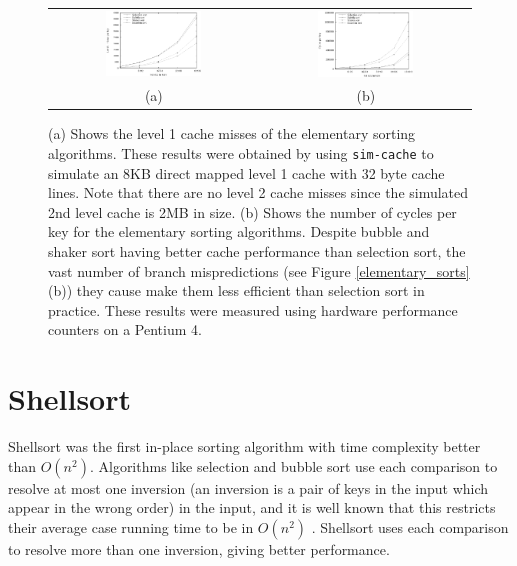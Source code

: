 \documentclass[acmtocl]{acmtrans2m}
\begin{document}
\begin{figure}
\centering
\begin{tabular}{cc}
\includegraphics[width=0.48\textwidth]{plots/elementary_cache1_misses.eps} & \includegraphics[width=0.48\textwidth]{plots/elementary_cycles.eps}\\
(a) & (b) \\
\end{tabular}
\caption{(a) Shows the level 1 cache misses of the elementary sorting
algorithms.  These results were obtained by using \texttt{sim-cache} to simulate
an 8KB direct mapped level 1 cache with 32 byte cache lines. Note that there are
no level 2 cache misses since the simulated 2nd level cache is 2MB in size.  (b)
Shows the number of cycles per key for the elementary sorting algorithms.
Despite bubble and shaker sort having better cache performance than selection
sort, the vast number of branch mispredictions (see Figure
\ref{elementary_sorts}(b)) they cause make them less efficient than selection
sort in practice.  These results were measured using hardware performance
counters on a Pentium 4.}
\label{shaker_plots}
\end{figure}

\section{Shellsort}

Shellsort \cite{Shell59} was the first in-place sorting algorithm with time
complexity better than $O(n^2)$.  Algorithms like selection and bubble sort use
each comparison to resolve at most one inversion (an inversion is a pair of keys
in the input which appear in the wrong order) in the input, and it is well known
that this restricts their average case running time to be in $O(n^2)$
\cite{KnuthVol3_98}. Shellsort uses each comparison to resolve more than one
inversion, giving better performance.
\end{document}
